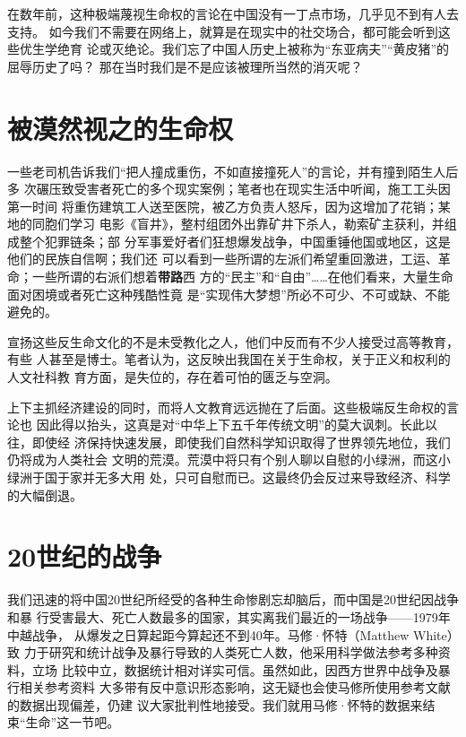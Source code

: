 在数年前，这种极端蔑视生命权的言论在中国没有一丁点市场，几乎见不到有人去支持。
如今我们不需要在网络上，就算是在现实中的社交场合，都可能会听到这些优生学绝育
论或灭绝论。我们忘了中国人历史上被称为“东亚病夫”“黄皮猪”的屈辱历史了吗？
那在当时我们是不是应该被理所当然的消灭呢？

\section{被漠然视之的生命权}

一些老司机告诉我们“把人撞成重伤，不如直接撞死人”的言论，并有撞到陌生人后多
次碾压致受害者死亡的多个现实案例；笔者也在现实生活中听闻，施工工头因第一时间
将重伤建筑工人送至医院，被乙方负责人怒斥，因为这增加了花销；某地的同胞们学习
电影《盲井》，整村组团外出靠矿井下杀人，勒索矿主获利，并组成整个犯罪链条；部
分军事爱好者们狂想爆发战争，中国重锤他国或地区，这是他们的民族自信啊；我们还
可以看到一些所谓的左派们希望重回激进，工运、革命；一些所谓的右派们想着\textbf{带路}西
方的“民主”和“自由”……在他们看来，大量生命面对困境或者死亡这种残酷性竟
是“实现伟大梦想”所必不可少、不可或缺、不能避免的。

宣扬这些反生命文化的不是未受教化之人，他们中反而有不少人接受过高等教育，有些
人甚至是博士。笔者认为，这反映出我国在关于生命权，关于正义和权利的人文社科教
育方面，是失位的，存在着可怕的匮乏与空洞。

上下主抓经济建设的同时，而将人文教育远远抛在了后面。这些极端反生命权的言论也
因此得以抬头，这真是对“中华上下五千年传统文明”的莫大讽刺。长此以往，即使经
济保持快速发展，即使我们自然科学知识取得了世界领先地位，我们仍将成为人类社会
文明的荒漠。荒漠中将只有个别人聊以自慰的小绿洲，而这小绿洲于国于家并无多大用
处，只可自慰而已。这最终仍会反过来导致经济、科学的大幅倒退。

\section{20世纪的战争}

我们迅速的将中国20世纪所经受的各种生命惨剧忘却脑后，而中国是20世纪因战争和暴
行受害最大、死亡人数最多的国家，其实离我们最近的一场战争——1979年中越战争，
从爆发之日算起距今算起还不到40年。马修·怀特（Matthew White）\cite{mattwhite}致
力于研究和统计战争及暴行导致的人类死亡人数，他采用科学做法参考多种资料，立场
比较中立，数据统计相对详实可信。虽然如此，因西方世界中战争及暴行相关参考资料
大多带有反中意识形态影响，这无疑也会使马修所使用参考文献的数据出现偏差，仍建
议大家批判性地接受。我们就用马修·怀特的数据来结束“生命”这一节吧。

